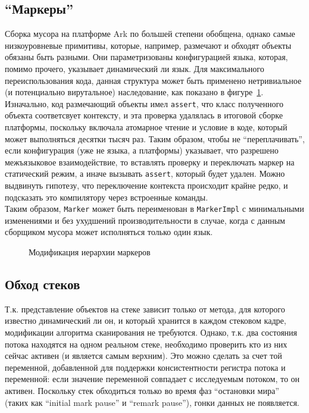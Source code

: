 \documentclass[times,specification,annotation]{itmo-student-thesis}
\begin{document}
\subsection{``Маркеры''}
Сборка мусора на платформе Ark по большей степени обобщена, однако самые низкоуровневые примитивы, которые, например, размечают и обходят объекты обязаны быть разными. Они параметризованы конфигурацией языка, которая, помимо прочего, указывает динамический ли язык. Для максимального переиспользования кода, данная структура может быть применено нетривиальное (и потенциально вирутальное) наследование, как показано в фигуре~\ref{fig:gc-markers}.\\
Изначально, код размечающий объекты имел \texttt{assert}, что класс полученного объекта соответсвует контексту, и эта проверка удалялась в итоговой сборке платформы, поскольку включала атомарное чтение и условие в коде, который может выполняться десятки тысяч раз. Таким образом, чтобы не ``переплачивать'', если конфигурация (уже не языка, а платформы) указывает, что разрешено межъязыковое взаимодействие, то вставлять проверку и переключать маркер на статический режим, а иначе вызывать \texttt{assert}, который будет удален. Можно выдвинуть гипотезу, что переключение контекста происходит крайне редко, и подсказать это компилятору через встроенные команды.\\
Таким образом, \texttt{Marker} может быть переименован в \texttt{MarkerImpl} с минимальными изменениями и без ухудшений производительности в случае, когда с данным сборщиком мусора может исполняться только один язык.
\begin{figure}[H]
\caption{Модификация иерархии маркеров}\label{fig:gc-markers}
\centering
\end{figure}
\subsection{Обход стеков}
Т.к. представление объектов на стеке зависит только от метода, для которого известно динамический ли он, и который хранится в каждом стековом кадре, модификации алгоритма сканирования не требуются. Однако, т.к. два состояния потока находятся на одном реальном стеке, необходимо проверить кто из них сейчас активен (и является самым верхним). Это можно сделать за счет той переменной, добавленной для поддержки консистентности регистра потока и переменной: если значение переменной совпадает с исследуемым потоком, то он активен. Поскольку стек обходиться только во время фаз ``остановки мира'' (таких как ``initial mark pause'' и ``remark pause''), гонки данных не появляется.
\end{document}
